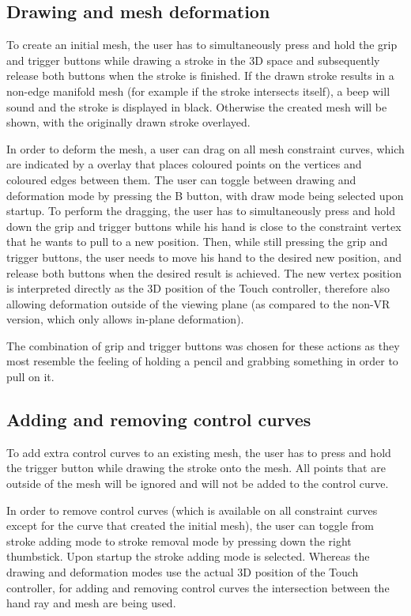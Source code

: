 \subsection{Drawing and mesh deformation}
To create an initial mesh, the user has to simultaneously press and hold the grip and trigger buttons while drawing a stroke in the 3D space and subsequently release both buttons when the stroke is finished. If the drawn stroke results in a non-edge manifold mesh (for example if the stroke intersects itself), a beep will sound and the stroke is displayed in black. Otherwise the created mesh will be shown, with the originally drawn stroke overlayed. 

In order to deform the mesh, a user can drag on all mesh constraint curves, which are indicated by a overlay that places coloured points on the vertices and coloured edges between them. The user can toggle between drawing and deformation mode by pressing the B button, with draw mode being selected upon startup. To perform the dragging, the user has to simultaneously press and hold down the grip and trigger buttons while his hand is close to the constraint vertex that he wants to pull to a new position. Then, while still pressing the grip and trigger buttons, the user needs to move his hand to the desired new position, and release both buttons when the desired result is achieved. The new vertex position is interpreted directly as the 3D position of the Touch controller, therefore also allowing deformation outside of the viewing plane (as compared to the non-VR version, which only allows in-plane deformation). 

The combination of grip and trigger buttons was chosen for these actions as they most resemble the feeling of holding a pencil and grabbing something in order to pull on it. 

\subsection{Adding and removing control curves}
To add extra control curves to an existing mesh, the user has to press and hold the trigger button while drawing the stroke onto the mesh. All points that are outside of the mesh will be ignored and will not be added to the control curve. 

In order to remove control curves (which is available on all constraint curves except for the curve that created the initial mesh), the user can toggle from stroke adding mode to stroke removal mode by pressing down the right thumbstick. Upon startup the stroke adding mode is selected. Whereas the drawing and deformation modes use the actual 3D position of the Touch controller, for adding and removing control curves the intersection between the hand ray and mesh are being used. 

